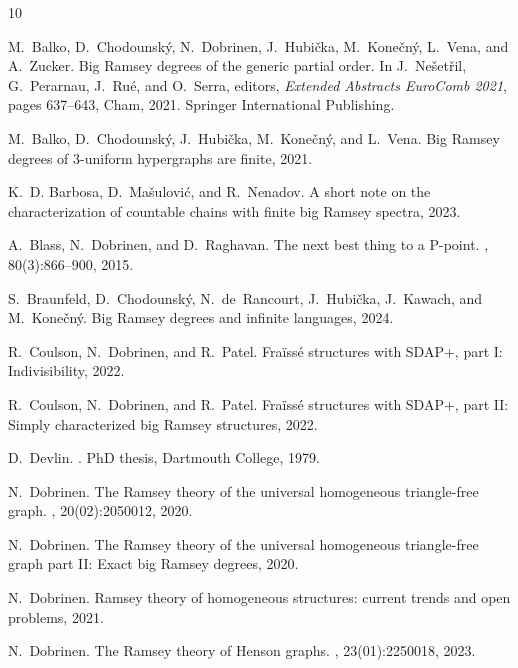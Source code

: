 \documentclass[10pt,a4paper]{article}
\theoremstyle{plain}
\theoremstyle{definition}
\begin{document}
\begin{thebibliography}{10}

M.~Balko, D.~Chodounsk{\'y}, N.~Dobrinen, J.~Hubi{\v{c}}ka,
  M.~Kone{\v{c}}n{\'y}, L.~Vena, and A.~Zucker.
\newblock Big {Ramsey} degrees of the generic partial order.
\newblock In J.~Ne{\v{s}}et{\v{r}}il, G.~Perarnau, J.~Ru{\'e}, and O.~Serra,
  editors, {\em Extended Abstracts EuroComb 2021}, pages 637--643, Cham, 2021.
  Springer International Publishing.

M.~Balko, D.~Chodounský, J.~Hubička, M.~Konečný, and L.~Vena.
\newblock Big {Ramsey} degrees of 3-uniform hypergraphs are finite, 2021.

K.~D. Barbosa, D.~Mašulović, and R.~Nenadov.
\newblock A short note on the characterization of countable chains with finite
  big {Ramsey} spectra, 2023.

A.~Blass, N.~Dobrinen, and D.~Raghavan.
\newblock The next best thing to a {P}-point.
, 80(3):866–900, 2015.

S.~Braunfeld, D.~Chodounský, N.~de~Rancourt, J.~Hubička, J.~Kawach, and
  M.~Konečný.
\newblock Big {Ramsey} degrees and infinite languages, 2024.

R.~Coulson, N.~Dobrinen, and R.~Patel.
\newblock Fra\"iss\'e structures with {SDAP}+, part {I}: Indivisibility, 2022.

R.~Coulson, N.~Dobrinen, and R.~Patel.
\newblock Fra\"iss\'e structures with {SDAP}+, part {II}: Simply characterized
  big {Ramsey} structures, 2022.

D.~Devlin.
.
\newblock PhD thesis, Dartmouth College, 1979.

N.~Dobrinen.
\newblock The {R}amsey theory of the universal homogeneous triangle-free graph.
, 20(02):2050012, 2020.

N.~Dobrinen.
\newblock The {Ramsey} theory of the universal homogeneous triangle-free graph
  part {II}: Exact big {Ramsey} degrees, 2020.

N.~Dobrinen.
\newblock Ramsey theory of homogeneous structures: current trends and open
  problems, 2021.

N.~Dobrinen.
\newblock The {R}amsey theory of {H}enson graphs.
, 23(01):2250018, 2023.


\end{thebibliography}
\end{document}
